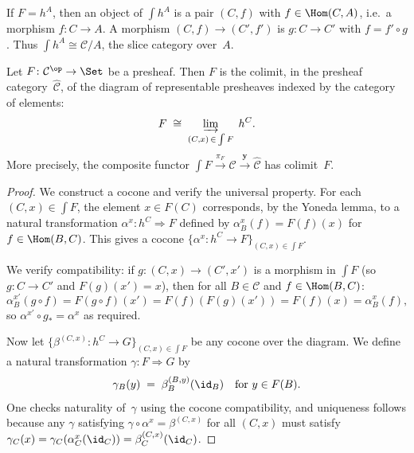 \begin{example}\label{ex:elements-representable}
If $F = h^A$, then an object of $\int h^A$ is a pair $(C,f)$ with
$f\in\Hom(C,A)$, i.e.\ a morphism $f\colon C\to A$.
A morphism $(C,f)\to(C',f')$ is $g\colon C\to C'$ with $f = f'\circ g$.
Thus $\int h^A \cong \mathcal{C}/A$, the slice category over~$A$.
\end{example}

\begin{theorem}%
\label{thm:presheaf-colim-rep}
Let $F\colon\mathcal{C}^{\op}\to\Set$ be a presheaf.  Then $F$ is the
colimit, in the presheaf category~$\widehat{\mathcal{C}}$, of the
diagram of representable presheaves indexed by the category of elements:
\[
    F \;\cong\; \varinjlim_{(C,x)\,\in\,\int F}\; h^C.
\]
More precisely, the composite functor
$\int F \xrightarrow{\pi_F} \mathcal{C} \xrightarrow{\mathbf{y}}
\widehat{\mathcal{C}}$
has colimit~$F$.
\end{theorem}

\begin{proof}
We construct a cocone and verify the universal property.
For each $(C,x)\in\int F$, the element $x\in F(C)$ corresponds, by the
Yoneda lemma, to a natural transformation
$\alpha^x\colon h^C\Rightarrow F$
defined by $\alpha^x_B(f) = F(f)(x)$ for $f\in\Hom(B,C)$.
This gives a cocone $\{\alpha^x\colon h^C\to F\}_{(C,x)\in\int F}$.

We verify compatibility: if $g\colon(C,x)\to(C',x')$ is a morphism in
$\int F$ (so $g\colon C\to C'$ and $F(g)(x') = x$), then for all
$B\in\mathcal{C}$ and $f\in\Hom(B,C)$:
\[
    \alpha^{x'}_B(g\circ f) = F(g\circ f)(x') = F(f)(F(g)(x'))
    = F(f)(x) = \alpha^x_B(f),
\]
so $\alpha^{x'}\circ g_* = \alpha^x$ as required.

Now let $\{\beta^{(C,x)}\colon h^C\to G\}_{(C,x)\in\int F}$ be any
cocone over the diagram.  We define a natural transformation
$\gamma\colon F\Rightarrow G$ by
\[
    \gamma_B(y) \;=\; \beta^{(B,y)}_B(\id_B) \quad\text{for } y\in F(B).
\]
One checks naturality of~$\gamma$ using the cocone compatibility, and
uniqueness follows because any $\gamma$ satisfying
$\gamma\circ\alpha^x = \beta^{(C,x)}$ for all $(C,x)$ must satisfy
$\gamma_C(x) = \gamma_C(\alpha^x_C(\id_C)) = \beta^{(C,x)}_C(\id_C)$.
\end{proof}


